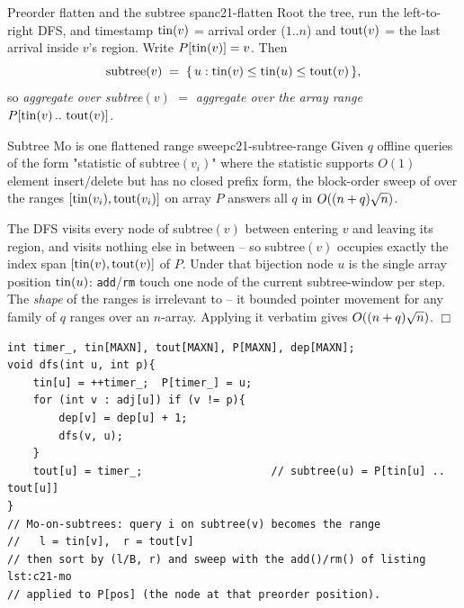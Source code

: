 \begin{definition}{Preorder flatten and the subtree span}{c21-flatten}
Root the tree, run the left-to-right DFS, and timestamp \(\operatorname{tin}(v)\) = arrival
order (\(1\)..\(n\)) and \(\operatorname{tout}(v)\) = the last arrival inside \(v\)'s region.
Write \(P[\operatorname{tin}(v)]=v\).  Then
\[
  \operatorname{subtree}(v) \;=\; \{\,u : \operatorname{tin}(v)\le \operatorname{tin}(u)\le \operatorname{tout}(v)\,\},
\]
so \emph{aggregate over subtree\((v)\)} \(=\) \emph{aggregate over the array
range} \(P[\operatorname{tin}(v)\,..\,\operatorname{tout}(v)]\).
\end{definition}

\begin{theorem}{Subtree Mo is one flattened range sweep}{c21-subtree-range}
Given \(q\) offline queries of the form "statistic of subtree\((v_i)\)" where
the statistic supports \(O(1)\) element insert/delete but has no closed prefix
form, the block-order sweep of  over the ranges
\([\operatorname{tin}(v_i),\operatorname{tout}(v_i)]\) on array \(P\) answers all \(q\) in
\(O((n+q)\sqrt n)\).
\end{theorem}
\begin{proofbox}
The DFS visits every node of subtree\((v)\) between entering \(v\) and leaving
its region, and visits nothing else in between -- so subtree\((v)\) occupies
exactly the index span \([\operatorname{tin}(v),\operatorname{tout}(v)]\) of \(P\).  Under that bijection
node \(u\) is the single array position \(\operatorname{tin}(u)\): \texttt{add}/\texttt{rm}
touch one node of the current subtree-window per step.  The \emph{shape} of the
ranges is irrelevant to  -- it bounded pointer movement
for any family of \(q\) ranges over an \(n\)-array.  Applying it verbatim gives
\(O((n+q)\sqrt n)\). \(\Box\)
\end{proofbox}

\begin{lstlisting}[caption={The flatten DFS plus the Mo-on-subtrees wiring: a query on subtree(v) is just the range tin[v] to tout[v] fed to the 27.1 block-order sweep. ASCII only, no underscores in identifiers}, label={lst:c21-flatten}]
int timer_, tin[MAXN], tout[MAXN], P[MAXN], dep[MAXN];
void dfs(int u, int p){
    tin[u] = ++timer_;  P[timer_] = u;
    for (int v : adj[u]) if (v != p){
        dep[v] = dep[u] + 1;
        dfs(v, u);
    }
    tout[u] = timer_;                    // subtree(u) = P[tin[u] .. tout[u]]
}
// Mo-on-subtrees: query i on subtree(v) becomes the range
//   l = tin[v],  r = tout[v]
// then sort by (l/B, r) and sweep with the add()/rm() of listing lst:c21-mo
// applied to P[pos] (the node at that preorder position).
\end{lstlisting}

